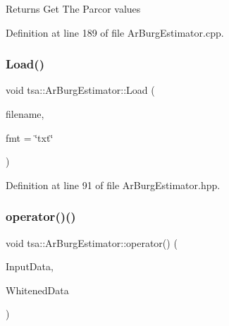 \begin{DoxyReturn}{Returns}
Get The Parcor values 
\end{DoxyReturn}


Definition at line 189 of file Ar\+Burg\+Estimator.\+cpp.

\mbox{\label{classtsa_1_1_ar_burg_estimator_a909ccc5f3ec7155ca60fb23122a8edfd}} 
\subsubsection{\texorpdfstring{Load()}{Load()}}
{\footnotesize\ttfamily void tsa\+::\+Ar\+Burg\+Estimator\+::\+Load (\begin{DoxyParamCaption}\item[{const char $\ast$}]{filename,  }\item[{const char $\ast$}]{fmt = {\ttfamily \char`\"{}txt\char`\"{}} }\end{DoxyParamCaption})\hspace{0.3cm}{\ttfamily [inline]}}



Definition at line 91 of file Ar\+Burg\+Estimator.\+hpp.

\mbox{\label{classtsa_1_1_ar_burg_estimator_a904c4776668339798aa429622989dae6}} 
\subsubsection{\texorpdfstring{operator()()}{operator()()}\hspace{0.1cm}{\footnotesize\ttfamily [1/2]}}
{\footnotesize\ttfamily void tsa\+::\+Ar\+Burg\+Estimator\+::operator() (\begin{DoxyParamCaption}\item[{\hyperlink{namespacetsa_ac599574bcc094eda25613724b8f3ca9e}{Seq\+View\+Double} \&}]{Input\+Data,  }\item[{\hyperlink{namespacetsa_ac599574bcc094eda25613724b8f3ca9e}{Seq\+View\+Double} \&}]{Whitened\+Data }\end{DoxyParamCaption})}

